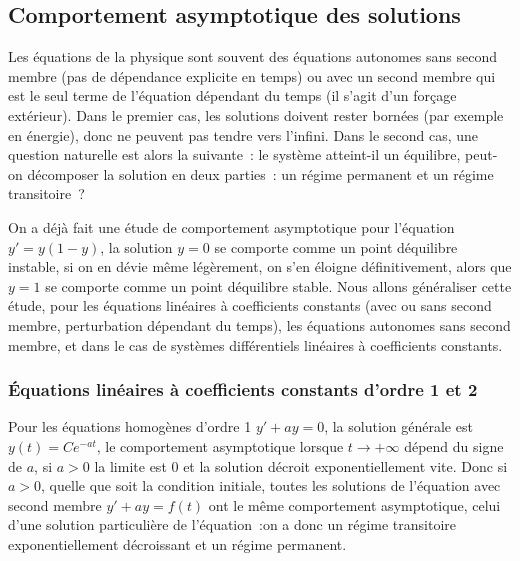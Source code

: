\documentclass[a4paper,11pt]{article}
\begin{document}
\subsection{Comportement asymptotique des solutions}
Les \'equations de la physique sont souvent des \'equations
autonomes sans second membre (pas de d\'ependance explicite en temps) 
ou avec un second membre
qui est le seul terme de l'\'equation d\'ependant du temps (il
s'agit d'un for\c{c}age ext\'erieur). Dans le premier cas,
les solutions doivent rester born\'ees (par exemple en \'energie), donc
ne peuvent pas tendre vers l'infini. Dans le second cas,
une question naturelle
est alors la suivante~: le syst\`eme atteint-il un \'equilibre,
peut-on d\'ecomposer la solution en deux parties~: un r\'egime
permanent et un r\'egime transitoire~?

On a d\'ej\`a fait une \'etude de comportement asymptotique
pour l'\'equation $y'=y(1-y)$, la solution $y=0$ se comporte
comme un point d\'equilibre instable, si on en d\'evie m\^eme
l\'eg\`erement, on s'en \'eloigne d\'efinitivement, alors que $y=1$ se
comporte comme un point d\'equilibre stable.
Nous allons g\'en\'eraliser cette \'etude, pour les \'equations
lin\'eaires \`a coefficients constants (avec ou sans second membre,
perturbation d\'ependant du temps),
les \'equations autonomes sans second membre,
et dans le cas de syst\`emes diff\'erentiels lin\'eaires \`a
coefficients constants.

\subsubsection{\'Equations lin\'eaires \`a coefficients constants 
d'ordre 1 et 2}
Pour les \'equations homog\`enes d'ordre 1 $y'+ay=0$, 
la solution g\'en\'erale est $y(t)=Ce^{-at}$, le comportement
asymptotique lorsque $t \rightarrow +\infty$ d\'epend du signe
de $a$, si $a>0$ la limite est 0 et la solution d\'ecroit
exponentiellement vite. Donc si $a>0$, quelle
que soit la condition initiale, toutes les solutions de 
l'\'equation avec second membre $y'+ay=f(t)$ ont
le m\^eme comportement asymptotique, celui
d'une solution particuli\`ere de l'\'equation~:on a donc
un r\'egime transitoire exponentiellement d\'ecroissant
et un r\'egime permanent.
\end{document}
